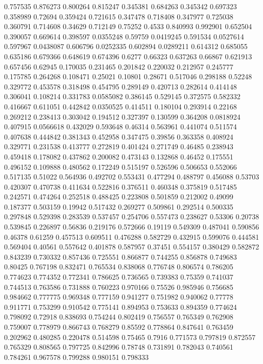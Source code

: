 0.757535 0.876273
0.800264 0.815247
0.345381 0.684263
0.345342 0.697323
0.358989 0.72694
0.359424 0.721615
0.347478 0.718408
0.347977 0.725038
0.360791 0.714608
0.34629 0.712149
0.75252 0.4533
0.840993 0.992901
0.652504 0.390057
0.669614 0.398597
0.0355248 0.59759
0.0419245 0.591534
0.0527614 0.597967
0.0438087 0.606796
0.0252335 0.602894
0.0289211 0.614312
0.685055 0.635186
0.679366 0.648619
0.674396 0.6277
0.66323 0.637263
0.66867 0.621913
0.657456 0.62945
0.170035 0.231465
0.201842 0.220032
0.212957 0.245777
0.175785 0.264268
0.108471 0.25021
0.10801 0.28671
0.517046 0.298188
0.52248 0.329772
0.453578 0.318498
0.454795 0.289149
0.420713 0.282614
0.414148 0.306041
0.108214 0.331783
0.0585082 0.386145
0.529145 0.372575
0.582332 0.416667
0.611051 0.442842
0.0350525 0.414511
0.180104 0.293914
0.22168 0.269212
0.238413 0.303042
0.194512 0.327397
0.130599 0.364208
0.0818924 0.407915
0.0566618 0.432029
0.593648 0.46314
0.563961 0.441074
0.511574 0.407638
0.444842 0.381343
0.452958 0.347475
0.39856 0.363358
0.408924 0.329771
0.231538 0.413777
0.272819 0.401424
0.271749 0.46485
0.238943 0.459418
0.178082 0.437862
0.200082 0.473143
0.132868 0.46452
0.175551 0.496152
0.109888 0.480562
0.172249 0.515197
0.526596 0.506653
0.552066 0.517135
0.51022 0.564936
0.492702 0.553431
0.477294 0.488797
0.456088 0.53703
0.420307 0.470738
0.411634 0.522816
0.376511 0.460348
0.375819 0.517485
0.242571 0.474264
0.252518 0.488425
0.223808 0.501859
0.212002 0.49099
0.187377 0.503159
0.19942 0.517432
0.269277 0.509861
0.292514 0.500335
0.297848 0.529398
0.283539 0.537457
0.254706 0.557473
0.238627 0.53306
0.20738 0.539845
0.226897 0.56836
0.219176 0.572666
0.19119 0.549309
0.487041 0.590856
0.46378 0.61259
0.457513 0.609511
0.476288 0.582729
0.432915 0.599076
0.444581 0.569404
0.40561 0.557642
0.401878 0.587957
0.37451 0.554157
0.380429 0.582872
0.843239 0.730332
0.857436 0.725551
0.866877 0.744255
0.856878 0.749683
0.80425 0.767198
0.832471 0.765534
0.838068 0.776748
0.806574 0.786205
0.774623 0.774352
0.772341 0.786625
0.736565 0.739383
0.75359 0.741037
0.744513 0.763586
0.731888 0.760223
0.970166 0.75526
0.985946 0.756685
0.984662 0.777775
0.969348 0.777159
0.941277 0.751982
0.940062 0.77778
0.911771 0.753299
0.910542 0.775141
0.894953 0.753633
0.894359 0.774624
0.798092 0.72918
0.838693 0.754244
0.802419 0.756557
0.765349 0.762908
0.759007 0.778979
0.866743 0.768279
0.85592 0.778864
0.847641 0.763459
0.202962 0.480285
0.220478 0.514598
0.75465 0.7916
0.771573 0.797819
0.872557 0.765329
0.808565 0.797725
0.842996 0.78748
0.731891 0.782043
0.740561 0.784261
0.967578 0.799288
0.980151 0.798333
